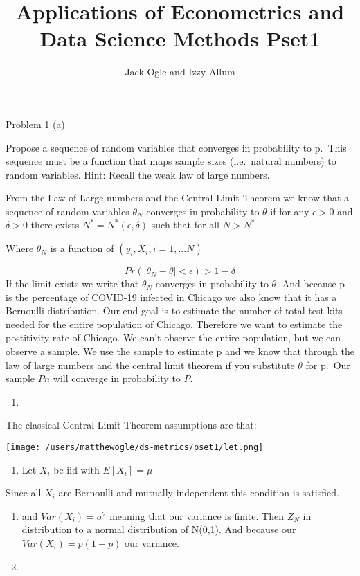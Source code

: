 \documentclass[
  12pt,
  landscape]{article}
\title{Applications of Econometrics and Data Science Methods Pset1}
\author{Jack Ogle and Izzy Allum}
\date{}
\providecommand{\tightlist}{%
  \setlength{\itemsep}{0pt}\setlength{\parskip}{0pt}}
\begin{document}
\maketitle

Problem 1 (a)

Propose a sequence of random variables that converges in probability to
p.~This sequence must be a function that maps sample sizes (i.e.~natural
numbers) to random variables. Hint: Recall the weak law of large
numbers.

From the Law of Large numbers and the Central Limit Theorem we know that
a sequence of random variables \({\theta_N }\) converges in probability
to \({\theta}\) if for any \({\epsilon} > 0\) and \({\delta} > 0\) there
exists \({N^*} = N^*(\epsilon, \delta)\) such that for all \({N > N^*}\)

Where \(\theta_N\) is a function of \((y_i, X_i, i = 1,...N)\)

\[
Pr(|\theta_N-\theta|<\epsilon) >1-\delta
\] If the limit exists we write that \({\theta_N}\) converges in
probability to \(\theta\). And because p is the percentage of COVID-19
infected in Chicago we also know that it has a Bernoulli distribution.
Our end goal is to estimate the number of total test kits needed for the
entire population of Chicago. Therefore we want to estimate the
postitivity rate of Chicago. We can't observe the entire population, but
we can observe a sample. We use the sample to estimate p and we know
that through the law of large numbers and the central limit theorem if
you substitute \(\theta\) for p.~Our sample \(Pn\) will converge in
probability to \(P\).

\begin{enumerate}
\def\labelenumi{(\alph{enumi})}
\setcounter{enumi}{1}
\item
\end{enumerate}

The classical Central Limit Theorem assumptions are that:

\texttt{[image: /users/matthewogle/ds-metrics/pset1/let.png]}

\begin{enumerate}
\def\labelenumi{(\roman{enumi})}
\tightlist
\item
  Let \(X_i\) be iid with \(E[X_i] = \mu\)
\end{enumerate}

Since all \(X_i\) are Bernoulli and mutually independent this condition
is satisfied.

\begin{enumerate}
\def\labelenumi{(\roman{enumi})}
\setcounter{enumi}{1}
\item
  and \(Var(X_i) = \sigma^2\) meaning that our variance is finite. Then
  \(Z_N\) in distribution to a normal distribution of N(0,1). And
  because our \(Var(X_i) = p(1-p)\) our variance.
\item
\end{enumerate}
\end{document}
